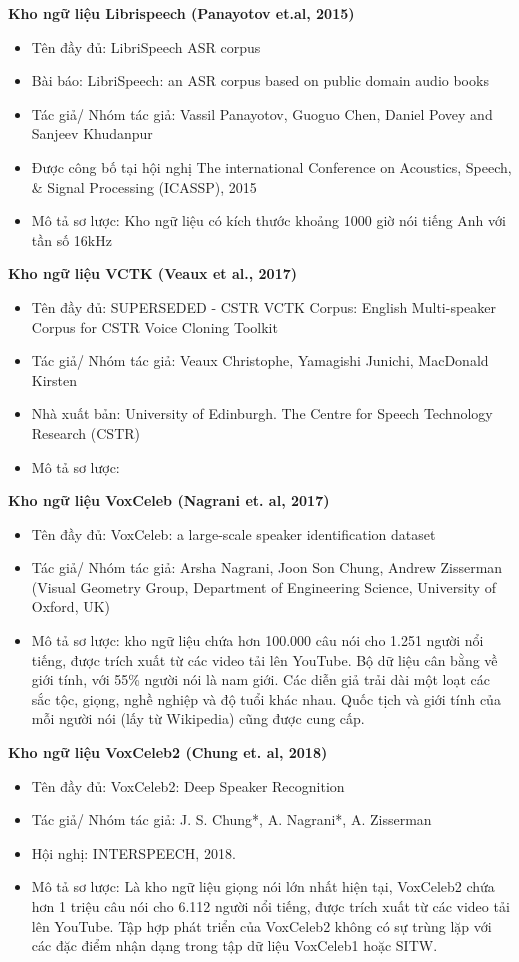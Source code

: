 \documentclass{article}
\begin{document}
	\textbf{Kho ngữ liệu Librispeech (Panayotov et.al, 2015)}
	\begin{itemize}
		\item Tên đầy đủ: LibriSpeech ASR corpus
		\item Bài báo: LibriSpeech: an ASR corpus based on public domain audio books
		\item Tác giả/ Nhóm tác giả: Vassil Panayotov, Guoguo Chen, Daniel Povey and Sanjeev Khudanpur
		\item Được công bố tại hội nghị The international Conference on Acoustics, Speech, \& Signal Processing (ICASSP), 2015
		\item Mô tả sơ lược: Kho ngữ liệu có kích thước khoảng 1000 giờ nói tiếng Anh với tần số 16kHz
	\end{itemize}	
	\textbf{Kho ngữ liệu VCTK (Veaux et al., 2017)}
	\begin{itemize}
		\item Tên đầy đủ: SUPERSEDED - CSTR VCTK Corpus: English Multi-speaker Corpus for CSTR Voice Cloning Toolkit
		\item Tác giả/ Nhóm tác giả: Veaux Christophe, Yamagishi Junichi, MacDonald Kirsten
		\item Nhà xuất bản: University of Edinburgh. The Centre for Speech Technology Research (CSTR)
		\item Mô tả sơ lược:
	\end{itemize}
	\textbf{Kho ngữ liệu VoxCeleb (Nagrani et. al, 2017)}
	\begin{itemize}
		\item Tên đầy đủ: VoxCeleb: a large-scale speaker identification dataset
		\item Tác giả/ Nhóm tác giả: Arsha Nagrani, Joon Son Chung, Andrew Zisserman (Visual Geometry Group, Department of Engineering Science, University of Oxford, UK)
		\item Mô tả sơ lược: kho ngữ liệu chứa hơn 100.000 câu nói cho 1.251 người nổi tiếng, được trích xuất từ các video tải lên YouTube. Bộ dữ liệu cân bằng về giới tính, với 55\% người nói là nam giới. Các diễn giả trải dài một loạt các sắc tộc, giọng, nghề nghiệp và độ tuổi khác nhau. Quốc tịch và giới tính của mỗi người nói (lấy từ Wikipedia) cũng được cung cấp.
	\end{itemize}
	\textbf{Kho ngữ liệu VoxCeleb2 (Chung et. al, 2018)}
	\begin{itemize}
		\item Tên đầy đủ: VoxCeleb2: Deep Speaker Recognition  
		\item Tác giả/ Nhóm tác giả: J. S. Chung*, A. Nagrani*, A. Zisserman
		\item Hội nghị: INTERSPEECH, 2018.  
		\item Mô tả sơ lược: Là kho ngữ liệu giọng nói lớn nhất hiện tại, VoxCeleb2 chứa hơn 1 triệu câu nói cho 6.112 người nổi tiếng, được trích xuất từ các video tải lên YouTube. Tập hợp phát triển của VoxCeleb2 không có sự trùng lặp với các đặc điểm nhận dạng trong tập dữ liệu VoxCeleb1 hoặc SITW.
	\end{itemize}
\end{document}
